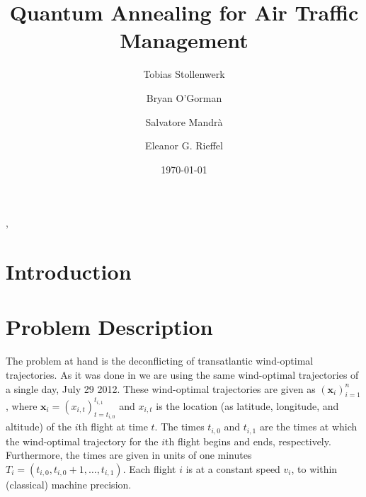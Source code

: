 \documentclass[aps,pra,twocolumn,10pt]{revtex4-1}
\begin{document}
\title{Quantum Annealing for Air Traffic Management}
\author{Tobias Stollenwerk}
\author{Bryan O'Gorman},
\author{Salvatore Mandr\`{a}}
\author{Eleanor G. Rieffel}
\date{\today}

\maketitle


\section{Introduction}


\section{Problem Description}
The problem at hand is the deconflicting of transatlantic wind-optimal trajectories.
As it was done in \cite{rodionova16} we are using the same wind-optimal trajectories of a single day, July 29 2012.
These wind-optimal trajectories are given as
${\left(\mathbf{x}_i\right)}_{i=1}^n$, 
where 
$\mathbf{x}_i = {\left(x_{i,t}\right)}_{t=t_{i,0}}^{t_{i,1}}$ 
and 
$x_{i, t}$ is the location (as latitude, longitude, and altitude) of the $i$th flight at time $t$.
The times $t_{i,0}$ and $t_{i, 1}$ are the times at which the wind-optimal trajectory for the $i$th flight begins and ends, respectively.
Furthermore, the times are given in units of one minutes $T_i = \left(t_{i, 0}, t_{i, 0} + 1, \ldots, t_{i, 1}\right)$.
Each flight $i$ is at a constant speed $v_i$, to within (classical) machine precision.
\end{document}
